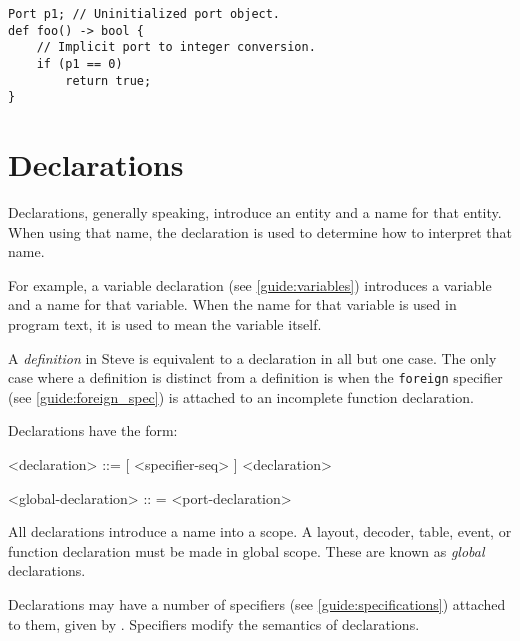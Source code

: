 \begin{minip}
\begin{lstlisting}
Port p1; // Uninitialized port object.
def foo() -> bool {
	// Implicit port to integer conversion.
	if (p1 == 0)
		return true;
}
\end{lstlisting}
\end{minip}


\section{Declarations} \label{guide:declarations}

Declarations, generally speaking, introduce an entity and a name for that entity. When using that name, the declaration is used to determine how to interpret that name. 

For example, a variable declaration (see \ref{guide:variables}) introduces a variable and a name for that variable. When the name for that variable is used in program text, it is used to mean the variable itself.

A \textit{definition} in Steve is equivalent to a declaration in all but one case. The only case where a definition is distinct from a definition is when the \texttt{foreign} specifier (see \ref{guide:foreign_spec}) is attached to an incomplete function declaration.

Declarations have the form:

\begin{minip}
\begin{grammar}
<declaration> ::=
[ <specifier-seq> ] <declaration>

<global-declaration> :: =
<port-declaration>
\end{grammar}
\end{minip}

All declarations introduce a name into a scope. A layout, decoder, table, event, or function declaration must be made in global scope. These are known as \textit{global} declarations.

Declarations may have a number of specifiers (see \ref{guide:specifications}) attached to them, given by . Specifiers modify the semantics of declarations.

